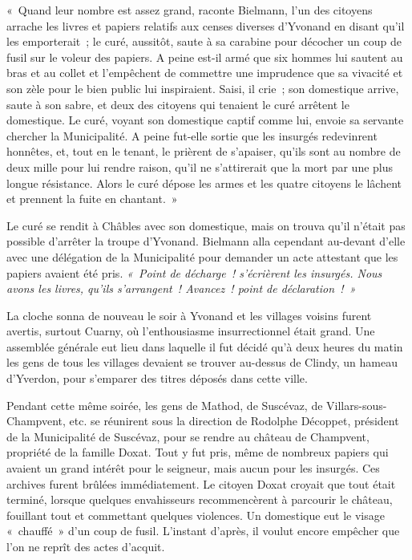 \documentclass[french,twoside]{book} %
\newenvironment{quoteblock}%
  {\begin{quoting}}
  {\end{quoting}}
\newenvironment{quotebar}{%
    \def\FrameCommand{{\color{rubric!10!}\vrule width 0.5em} \hspace{0.9em}}%
    \def\OuterFrameSep{\itemsep} %
    \MakeFramed {\advance\hsize-\width \FrameRestore}
  }%
  {%
    \endMakeFramed
  }
\renewenvironment{quoteblock}%
  {%
    \savenotes
    \setstretch{0.9}
    \normalfont
    \begin{quotebar}
  }
  {%
    \end{quotebar}
    \spewnotes
  }
\begin{document}
\begin{quoteblock}
 \noindent « Quand leur nombre est assez grand, raconte Bielmann, l’un des citoyens arrache les livres et papiers relatifs aux censes diverses d’Yvonand en disant qu’il les emporterait ; le curé, aussitôt, saute à sa carabine pour décocher un coup de fusil sur le voleur des papiers. A peine est-il armé que six hommes lui sautent au bras et au collet et l’empêchent de commettre une imprudence que sa vivacité et son zèle pour le bien public lui inspiraient. Saisi, il crie ; son domestique arrive, saute à son sabre, et deux des citoyens qui tenaient le curé arrêtent le domestique. Le curé, voyant son domestique captif comme lui, envoie sa servante chercher la Municipalité. A peine fut-elle sortie que les insurgés redevinrent honnêtes, et, tout en le tenant, le prièrent de s’apaiser, qu’ils sont au nombre de deux mille pour lui rendre raison, qu’il ne s’attirerait que la mort par une plus longue résistance. Alors le curé dépose les armes et les quatre citoyens le lâchent et prennent la fuite en chantant. »
 \end{quoteblock}

\noindent Le curé se rendit à Châbles avec son domestique, mais on trouva qu’il n’était pas possible d’arrêter la troupe d’Yvonand. Bielmann alla cependant au-devant d’elle avec une délégation de la Municipalité pour demander un acte attestant que les papiers avaient été pris. \emph{« Point de décharge ! s’écrièrent les insurgés. Nous avons les livres, qu’ils s’arrangent ! Avancez ! point de déclaration ! »}\par
La cloche sonna de nouveau le soir à Yvonand et les villages voisins furent avertis, surtout Cuarny, où l’enthousiasme insurrectionnel était grand. Une assemblée générale eut lieu dans laquelle il fut décidé qu’à deux heures du matin les gens de tous les villages devaient se trouver au-dessus de Clindy, un hameau d’Yverdon, pour s’emparer des titres déposés dans cette ville.\par
Pendant cette même soirée, les gens de Mathod, de Suscévaz, de Villars-sous-Champvent, etc. se réunirent sous la direction de Rodolphe Décoppet, président de la Municipalité de Suscévaz, pour se rendre au château de Champvent, propriété de la famille Doxat. Tout y fut pris, même de nombreux papiers qui avaient un grand intérêt pour le seigneur, mais aucun pour les insurgés. Ces archives furent brûlées immédiatement. Le citoyen Doxat croyait que tout était terminé, lorsque quelques envahisseurs recommencèrent à parcourir le château, fouillant tout et commettant quelques violences. Un domestique eut le visage « chauffé » d’un coup de fusil. L’instant d’après, il voulut encore empêcher que l’on ne reprît des actes d’acquit.\par
\end{document}
